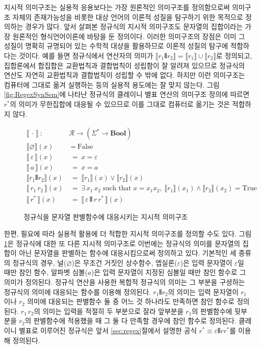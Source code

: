지시적 의미구조는 실용적 응용보다는 가장 원론적인 의미구조를 정의함으로써
의미구조 자체의 존재가능성을 비롯한 대상 언어의 이론적 성질을 탐구하기 위한
목적으로 정의하는 경우가 많다. 앞서 살펴본 정규식의 지시적 의미구조도
문자열의 집합이라는 가장 원론적인 형식언어이론에 바탕을 둔 정의이다.
이러한 의미구조의 장점은 이미 그 성질이 명확히 규명되어 있는 수학적 대상을
활용하므로 이론적 성질의 탐구에 적합하다는 것이다. 예를 들면
정규식에서 \VERT 연산자의 의미가 $ \llbracket r_1\VERT r_2\rrbracket
= \llbracket r_1\rrbracket\cup\llbracket r_2\rrbracket$로 정의되고,
집합론에서 합집합은 교환법칙과 결합법칙이 성립함이 잘 알려져 있으므로
정규식의 \VERT 연산도 자연히 교환법칙과 결합법칙이 성립할 수 밖에 없다.
하지만 이런 의미구조는 컴퓨터에 그대로 옮겨 실행하는 등의 실용적 용도에는
잘 맞지 않는다. 그림\;\ref{fig:RegexSynSem}에 나타난 정규식의
클레이니 별표 연산의 의미구조 정의에 따르면 $r^{*}$의 의미가 무한집합에
대응될 수 있으므로 이를 그대로 컴퓨터로 옮기는 것은 적합하지 않다.

\begin{figure}
\begin{align*}
\llbracket\,\cdot\,\rrbracket
 ~:~& \mathcal{R} \to (\Sigma^{*} \to \textbf{Bool})
\\
\llbracket \varnothing \rrbracket(x)   &~=~ \text{False} \\
\llbracket\,\varepsilon\,\rrbracket(x) &~=~ x=\varepsilon \\
\llbracket\,a\,\rrbracket(x)           &~=~ x=a \\
\llbracket r_1 \VERT r_2 \rrbracket(x) &~=~
 \llbracket r_1\rrbracket(x) \lor \llbracket r_2\rrbracket(x)\\
\llbracket\,r_1 \, r_2\,\rrbracket(x) &~=~
  \exists\,x_1\,x_2 \;\text{such that}\; x=x_1x_2,~
  \llbracket r_1\rrbracket(x_1) \land \llbracket r_2\rrbracket(x_2)
  = \text{True} \\
\llbracket\, r^{*} \,\rrbracket(x) &~=~
 \llbracket\,\varepsilon\,\VERT\,r\,r^{*}\,\rrbracket(x)
\end{align*}
\caption{정규식을 문자열 판별함수에 대응시키는
         지시적 의미구조\label{fig:RegexDenoSem}}
\end{figure}

한편, 필요에 따라 실용적 활용에 더 적합한 지시적 의미구조를
정의할 수도 있다. 그림\;\ref{fig:RegexDenoSem}은 정규식에 대한
또 다른 지시적 의미구조로 이번에는 정규식의 의미를 문자열의 집합이
아닌 문자열을 판별하는 함수에 대응시킴으로써 정의하고 있다. 기본적인
세 종류의 정규식의 경우, 널($\varnothing$)은 무조건 거짓인 상수함수,
엡실론($\varepsilon$)은 입력 문자열이 $\varepsilon$일 때만 참인 함수,
알파벳 심볼($a$)은 입력 문자열이 지정된 심볼일 때만 참인 함수로 그
의미가 정의된다. 정규식 연산을 사용한 복합적 정규식의 의미는
그 부분을 구셩하는 정규식의 의미에 대응되는 함수를 이용해 정의된다.
$r_1\VERT r_2$의 의미는 입력 문자열이 $r_1$이나 $r_2$ 의미에 대응되는
판별함수 둘 중 어느 것 하나라도 만족하면 참인 함수로 정의된다.
$r_1\,r_2$의 의미는 입력을 적절히 두 부분으로 잘라 앞부분을 $r_1$의
판별함수에 뒷부분을 $r_2$의 판별함수에 적용했을 때 그 둘 다
만족할 경우에 참인 함수로 정의된다. 클레이니 별표로
이루어진 정규식은 앞서 \ref{sec:regex}절에서 설명한 공식
$r^{*} \equiv \varepsilon\VERT rr^{*}$를 이용해 정의된다.

